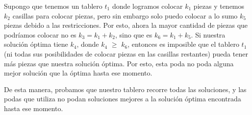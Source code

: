 Supongo que tenemos un tablero $t_1$ donde logramos colocar $k_1$ piezas y tenemos $k_2$ casillas para colocar piezas, pero sin embargo solo puedo colocar a lo sumo $k_5$ piezas debido a las restricciones. Por esto, ahora la mayor cantidad de piezas que podríamos colocar no es $k_3 = k_1 + k_2$, sino que es $k_6 = k_1 + k_5$. Si nuestra solución óptima tiene $k_4$, donde $k_4$ $\geq$ $k_6$, entonces es imposible que el tablero $t_1$ (ni todas sus posibilidades de colocar piezas en las casillas restantes) pueda tener más piezas que nuestra solución óptima. Por esto, esta poda no poda alguna mejor solución que la óptima hasta ese momento.

De esta manera, probamos que nuestro tablero recorre todas las soluciones, y las podas que utiliza no podan soluciones mejores a la solución óptima encontrada hasta ese momento.
